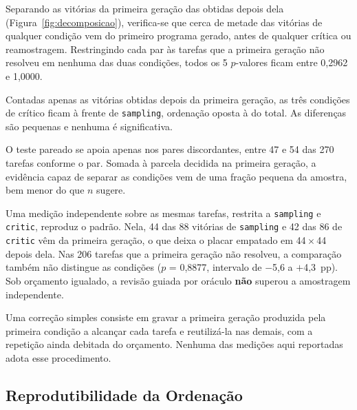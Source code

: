 \documentclass[letterpaper]{article} %
\newcommand{\numComparacoes}{5}
\newcommand{\An}{270}
\newcommand{\CtresDisc}{47}\newcommand{\CtresSplit}{$26{\times}21$} \newcommand{\Ctresp}{0{,}5601}
\newcommand{\CcincoDisc}{54}\newcommand{\CcincoSplit}{$32{\times}22$} \newcommand{\Ccincop}{0{,}2203}
\newcommand{\RpMenor}{0{,}2962} \newcommand{\RpMaior}{1{,}0000}
\newcommand{\BsampRes}{88} \newcommand{\BcritRes}{86}
\newcommand{\BsampPrimeira}{44} \newcommand{\BcritPrimeira}{42}
\newcommand{\BsampCiclo}{44} \newcommand{\BcritCiclo}{44}
\newcommand{\BdiscrimN}{206}
\newcommand{\Bp}{0{,}8877}
\newcommand{\BicBaixo}{\mbox{$-$5{,}6}} \newcommand{\BicAlto}{\mbox{$+$4{,}3}}
\newcommand{\vereditoUm}{a revisão guiada por oráculo \textbf{não} superou a
amostragem independente}
\newcommand{\vereditoTres}{cerca de metade das vitórias de qualquer condição vem
do primeiro programa gerado, antes de qualquer crítica ou reamostragem}
\begin{document}
Separando as vitórias da primeira geração das obtidas depois dela
(Figura~\ref{fig:decomposicao}), verifica-se que \vereditoTres{}. Restringindo
cada par às tarefas que a primeira geração não resolveu em nenhuma das duas
condições, todos os \numComparacoes{} $p$-valores ficam entre \RpMenor{} e
\RpMaior{}.

Contadas apenas as vitórias obtidas depois da primeira geração, as três condições
de crítico ficam à frente de \texttt{sampling}, ordenação oposta à do total. As
diferenças são pequenas e nenhuma é significativa.

O teste pareado se apoia apenas nos pares discordantes, entre \CtresDisc{} e
\CcincoDisc{} das \An{} tarefas conforme o par. Somada à parcela decidida na
primeira geração, a evidência capaz de separar as condições vem de uma fração
pequena da amostra, bem menor do que $n$ sugere.

Uma medição independente sobre as mesmas tarefas, restrita a \texttt{sampling} e
\texttt{critic}, reproduz o padrão. Nela, \BsampPrimeira{} das \BsampRes{}
vitórias de \texttt{sampling} e \BcritPrimeira{} das \BcritRes{} de
\texttt{critic} vêm da primeira geração, o que deixa o placar empatado em
\BsampCiclo{}\,$\times$\,\BcritCiclo{} depois dela. Nas \BdiscrimN{} tarefas que
a primeira geração não resolveu, a comparação também não distingue as condições
($p$ = \Bp{}, intervalo de \BicBaixo{} a \BicAlto~pp). Sob orçamento igualado,
\vereditoUm{}.

Uma correção simples consiste em gravar a primeira geração produzida pela
primeira condição a alcançar cada tarefa e reutilizá-la nas demais, com a
repetição ainda debitada do orçamento. Nenhuma das medições aqui reportadas adota
esse procedimento.

\subsection{Reprodutibilidade da Ordenação}
\end{document}
